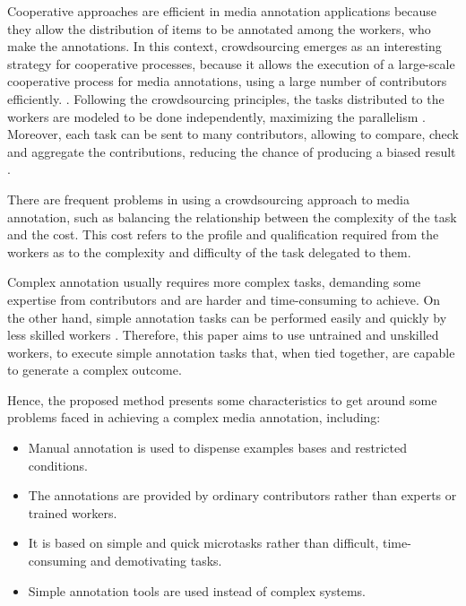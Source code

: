 Cooperative approaches are efficient in media annotation applications because they allow the distribution of items to be annotated among the workers, who make the annotations. In this context, crowdsourcing emerges as an interesting strategy for cooperative processes, because it allows the execution of a large-scale cooperative process for media annotations, using a large number of contributors efficiently. \cite{VonAhn:2005:HC:1168246}. Following the crowdsourcing principles, the tasks distributed to the workers are modeled to be done independently, maximizing the parallelism \citep{Howe2006}. Moreover, each task can be sent to many contributors, allowing to compare, check and aggregate the contributions, reducing the chance of producing a biased result \cite{GALTON1907}.

There are frequent problems in using a crowdsourcing approach to media annotation, such as balancing the relationship between the complexity of the task and the cost. This cost refers to the profile and qualification required from the workers as to the complexity and difficulty of the task delegated to them.

\pagebreak

Complex annotation usually requires more complex tasks, demanding some expertise from contributors and are harder and time-consuming to achieve. On the other hand, simple annotation tasks can be performed easily and quickly by less skilled workers \cite{Difallah:2015:DMC:2736277.2741685}. Therefore, this paper aims to use untrained and unskilled workers, to execute simple annotation tasks that, when tied together, are capable to generate a complex outcome.


Hence, the proposed method presents some characteristics to get around some problems faced in achieving a complex media annotation, including:


\begin{itemize}

\item Manual annotation is used to dispense examples bases and restricted conditions.

\item The annotations are provided by ordinary contributors rather than experts or trained workers.

\item It is based on simple and quick microtasks rather than difficult, time-consuming and demotivating tasks.

\item Simple annotation tools are used instead of complex systems.

\end{itemize}


